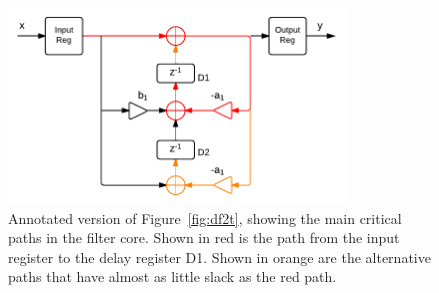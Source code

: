 \documentclass[]{article}
\begin{document}
\begin{figure}[htbp]
	\begin{center}
		\includegraphics[width = 0.8\textwidth]{DirectFormIITransposedCritpath.pdf}
	\end{center}
	\caption{Annotated version of Figure~\ref{fig:df2t}, showing the main critical paths in the filter core. Shown in red is the path from the input register to the delay register D1. Shown in orange are the alternative paths that have almost as little slack as the red path.}
	\label{fig:df2tCritpath}
\end{figure}

\pagebreak




\end{document}
